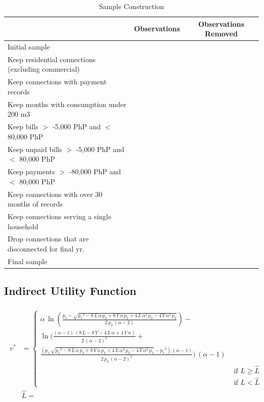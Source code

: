 \documentclass[12pt]{article}
\begin{document}
\begin{table}[H]
\centering
\caption{Sample Construction}\label{table:sampleconstruction}
\vspace{-2mm}
\begin{tabular}{l*{1}{cc}}
\toprule
 & Observations & Observations Removed  \\
\midrule
Initial sample   &           &     \\
Keep residential connections (excluding commercial)   &            &      \\
Keep connections with payment records &  &      \\
Keep months with consumption under 200 m3    &            &       \\
Keep bills $>$ -5,000 PhP and $<$ 80,000 PhP  &  &   \\
Keep unpaid bills $>$ -5,000 PhP and $<$ 80,000 PhP &             &       \\
Keep payments $>$ -80,000 PhP and $<$ 80,000 PhP    &            &       \\
Keep connections with over 30 months of records   &            &       \\
Keep connections serving a single household   &            &       \\
Drop connections that are disconnected for final yr.  &            &       \\
Final sample &  & \\
\bottomrule
\end{tabular}
\end{table}

\subsection{Indirect Utility Function}\label{appendix:indirectutil}

\begin{align}\label{eq:vstar}
\begin{split}
v^{*} &= 
\begin{cases}
\alpha \,\ln(\frac{p_{1}-\sqrt{{p_{1}}^2-8\,L\,\alpha \,p_{2}+8\,Y\,\alpha \,p_{2}+4\,L\,\alpha ^2\,p_{2}-4\,Y\,\alpha ^2\,p_{2}}}{2\,p_{2}\,(\alpha -2)})- \\ \ln(\frac{(\alpha -1)\,(8\,L-8\,Y-4\,L\,\alpha +4\,Y\,\alpha )}{2\,{(\alpha -2)}^2}+ \\
\frac{(p_{1}\,\sqrt{{p_{1}}^2-8\,L\,\alpha \,p_{2}+8\,Y\,\alpha \,p_{2}+4\,L\,\alpha ^2\,p_{2}-4\,Y\,\alpha ^2\,p_{2}}-{p_{1}}^2)\,(\alpha -1)}{2\,p_{2}\,{(\alpha -2)}^2})\,(\alpha -1)\\
 &\text{ if } L \geq \widehat{L} \\
 &\text{ if } L < \widehat{L}
\end{cases} \\
&\widehat{L} = 
\end{split}
\end{align}
\end{document}
